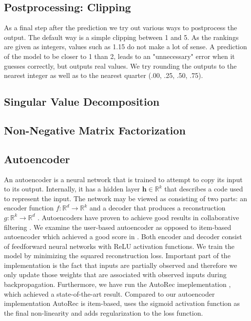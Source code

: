 \documentclass[10pt,conference,compsocconf]{IEEEtran}
\begin{document}
    \subsection{Postprocessing: Clipping}
    As a final step after the prediction we try out various ways to postprocess the output.
    The default way is a simple clipping between 1 and 5.
    As the rankings are given as integers, values such as 1.15 do not make a lot of sense.
    A prediction of the model to be closer to 1 than 2, leads to an "unnecessary" error when it guesses correctly, but outputs real values.
    We try rounding the outputs to the nearest integer as well as to the nearest quarter (.00, .25, .50, .75).

    \subsection{Singular Value Decomposition}

    \subsection{Non-Negative Matrix Factorization}

    \subsection{Autoencoder}
    An autoencoder is a neural network that is trained to attempt to copy its input to its output.
    Internally, it has a hidden layer $\textbf{h} \in \mathbb{R}^k$ that describes a code used to represent the input.
    The network may be viewed as consisting of two parts: an encoder function $f: \mathbb{R} ^d \rightarrow \mathbb{R} ^k$ and a
    decoder that produces a reconstruction $g: \mathbb{R} ^k \rightarrow \mathbb{R} ^d$ \cite{Goodfellow-et-al-2016}. Autoencoders
    have proven to achieve good results in collaborative filtering \cite{inproceedings}. We examine the user-based
    autoencoder as opposed to item-based autoencoder which achieved a good score in \cite{inproceedings}. Both encoder
    and decoder consist of feedforward neural networks with ReLU activation functions. We train the model by minimizing
    the squared reconstruction loss. Important part of the implementation is the fact that inputs are partially observed
    and therefore we only update those weights that are associated with observed inputs during backpropagation.
    Furthermore, we have run the AutoRec imeplementation \cite{inproceedings}, which achieved a state-of-the-art result.
    Compared to our autoencoder implementation AutoRec is item-based, uses the sigmoid activation function as the final non-linearity and adds regularization to the loss function.
\end{document}
